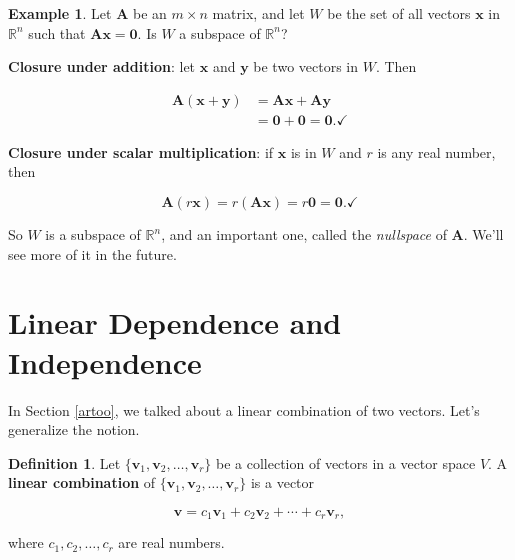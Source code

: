\documentclass[
]{book}
\theoremstyle{definition}
\newtheorem{definition}{Definition}[chapter]
\theoremstyle{definition}
\newtheorem{example}{Example}[chapter]
\theoremstyle{definition}
\theoremstyle{definition}
\theoremstyle{remark}
\begin{document}
\begin{examplebox}

\begin{example}
\protect\hypertarget{exm:Nullspace}{}\label{exm:Nullspace}Let \(\mathbf{A}\) be an \(m\times n\) matrix, and let \(W\) be the set of all vectors \(\mathbf{x}\) in \(\mathbb{R}^n\) such that \(\mathbf{A}\mathbf{x}=\mathbf{0}\). Is \(W\) a subspace of \(\mathbb{R}^n\)?

\textbf{Closure under addition}: let \(\mathbf{x}\) and \(\mathbf{y}\) be two vectors in \(W\). Then

\begin{align*}
\mathbf{A}\left(\mathbf{x}+\mathbf{y}\right)&=\mathbf{A}\mathbf{x}+\mathbf{A}\mathbf{y}\\
&=\mathbf{0}+\mathbf{0}=\mathbf{0}.\checkmark
\end{align*}

\textbf{Closure under scalar multiplication}: if \(\mathbf{x}\) is in \(W\) and \(r\) is any real number, then

\[\mathbf{A}(r\mathbf{x})=r(\mathbf{A}\mathbf{x})=r\mathbf{0}=\mathbf{0}.\checkmark\]

So \(W\) is a subspace of \(\mathbb{R}^n\), and an important one, called the \emph{nullspace} of \(\mathbf{A}\). We'll see more of it in the future.
\end{example}

\end{examplebox}

\section{Linear Dependence and Independence}\label{linear-dependence-and-independence-1}

In Section \ref{artoo}, we talked about a linear combination of two vectors. Let's generalize the notion.

\begin{defbox}

\begin{definition}
\protect\hypertarget{def:LinComb}{}\label{def:LinComb}Let \(\{\mathbf{v}_1,\mathbf{v}_2,\dots,\mathbf{v}_r\}\)
be a collection of vectors in a vector space \(V\). A \textbf{linear combination} of \(\{\mathbf{v}_1,\mathbf{v}_2,\dots,\mathbf{v}_r\}\) is a vector

\[\mathbf{v}=c_1\mathbf{v}_1+c_2\mathbf{v}_2+\cdots+c_r\mathbf{v}_r,\]

where \(c_1,c_2,\dots,c_r\) are real numbers.
\end{definition}

\end{defbox}
\end{document}
